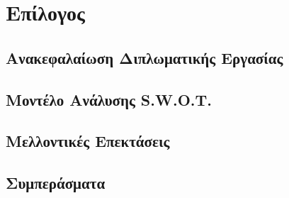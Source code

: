 \chapter{Επίλογος}

\section{Ανακεφαλαίωση Διπλωματικής Εργασίας}

\section{Μοντέλο Ανάλυσης S.W.O.T.}

\section{Μελλοντικές Επεκτάσεις}

\section{Συμπεράσματα}
